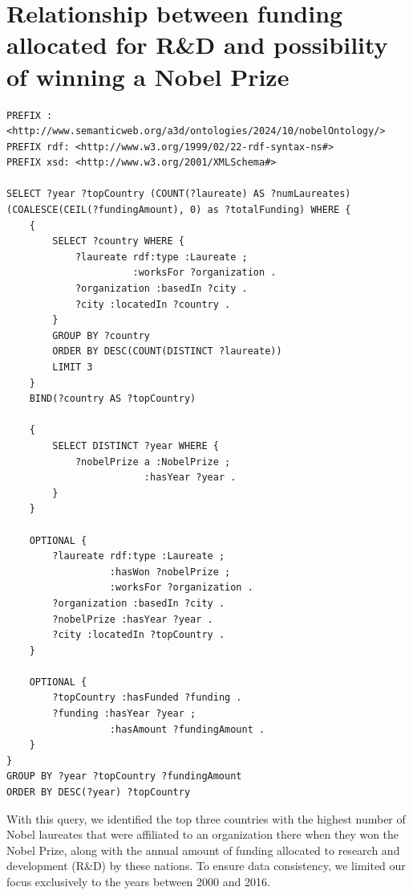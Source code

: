 \documentclass{article}
\begin{document}
\newpage

\section{Relationship between funding allocated for R\&D and possibility of winning a Nobel Prize}
\label{sec:fundings}
\begin{lstlisting}
PREFIX : <http://www.semanticweb.org/a3d/ontologies/2024/10/nobelOntology/>
PREFIX rdf: <http://www.w3.org/1999/02/22-rdf-syntax-ns#>
PREFIX xsd: <http://www.w3.org/2001/XMLSchema#>

SELECT ?year ?topCountry (COUNT(?laureate) AS ?numLaureates) (COALESCE(CEIL(?fundingAmount), 0) as ?totalFunding) WHERE {
    {
        SELECT ?country WHERE {
            ?laureate rdf:type :Laureate ;
                      :worksFor ?organization .
            ?organization :basedIn ?city .
            ?city :locatedIn ?country .
        }
        GROUP BY ?country
        ORDER BY DESC(COUNT(DISTINCT ?laureate))
        LIMIT 3
    }
    BIND(?country AS ?topCountry)

    {
        SELECT DISTINCT ?year WHERE {
            ?nobelPrize a :NobelPrize ;
                        :hasYear ?year .
        }
    }

    OPTIONAL {
        ?laureate rdf:type :Laureate ;
                  :hasWon ?nobelPrize ;
                  :worksFor ?organization .
        ?organization :basedIn ?city .
        ?nobelPrize :hasYear ?year .
        ?city :locatedIn ?topCountry .
    }

    OPTIONAL {
        ?topCountry :hasFunded ?funding .
        ?funding :hasYear ?year ;
                  :hasAmount ?fundingAmount .
    }
}
GROUP BY ?year ?topCountry ?fundingAmount
ORDER BY DESC(?year) ?topCountry
\end{lstlisting}

\vspace{1em}

With this query, we identified the top three countries with the highest number of Nobel laureates that were affiliated
to an organization there when they won the Nobel Prize, along with the annual amount of funding allocated to
research and development (R\&D) by these nations. To ensure data consistency, we limited our focus exclusively to
the years between 2000 and 2016.
\end{document}
